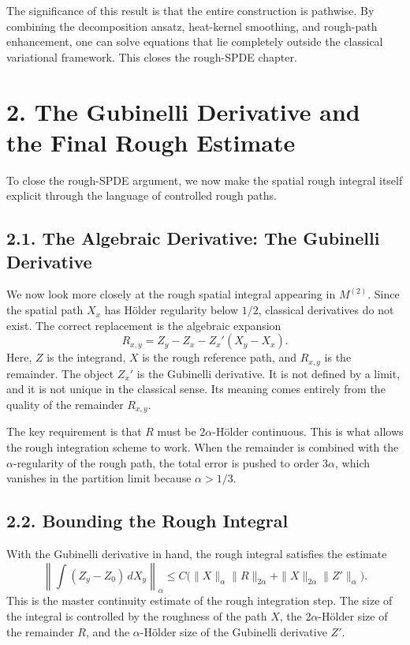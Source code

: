 \documentclass[11pt]{article}
\theoremstyle{definition}
\theoremstyle{remark}
\begin{document}
The significance of this result is that the entire construction is pathwise. By combining the decomposition ansatz, heat-kernel smoothing, and rough-path enhancement, one can solve equations that lie completely outside the classical variational framework. This closes the rough-SPDE chapter.

\section*{2. The Gubinelli Derivative and the Final Rough Estimate}
To close the rough-SPDE argument, we now make the spatial rough integral itself explicit through the language of controlled rough paths.

\subsection*{2.1. The Algebraic Derivative: The Gubinelli Derivative}
We now look more closely at the rough spatial integral appearing in \(M^{(2)}\). Since the spatial path \(X_x\) has Hölder regularity below \(1/2\), classical derivatives do not exist. The correct replacement is the algebraic expansion
\[
R_{x,y}=Z_y-Z_x-Z_x'(X_y-X_x).
\]
Here, \(Z\) is the integrand, \(X\) is the rough reference path, and \(R_{x,y}\) is the remainder. The object \(Z_x'\) is the Gubinelli derivative. It is not defined by a limit, and it is not unique in the classical sense. Its meaning comes entirely from the quality of the remainder \(R_{x,y}\).

The key requirement is that \(R\) must be \(2\alpha\)-Hölder continuous. This is what allows the rough integration scheme to work. When the remainder is combined with the \(\alpha\)-regularity of the rough path, the total error is pushed to order \(3\alpha\), which vanishes in the partition limit because \(\alpha>1/3\).

\subsection*{2.2. Bounding the Rough Integral}
With the Gubinelli derivative in hand, the rough integral satisfies the estimate
\[
\left\|
\int (Z_y-Z_0)\,dX_y
\right\|_\alpha
\le
C\bigl(
\|X\|_\alpha\|R\|_{2\alpha}
+
\|X\|_{2\alpha}\|Z'\|_\alpha
\bigr).
\]
This is the master continuity estimate of the rough integration step. The size of the integral is controlled by the roughness of the path \(X\), the \(2\alpha\)-Hölder size of the remainder \(R\), and the \(\alpha\)-Hölder size of the Gubinelli derivative \(Z'\).
\end{document}
